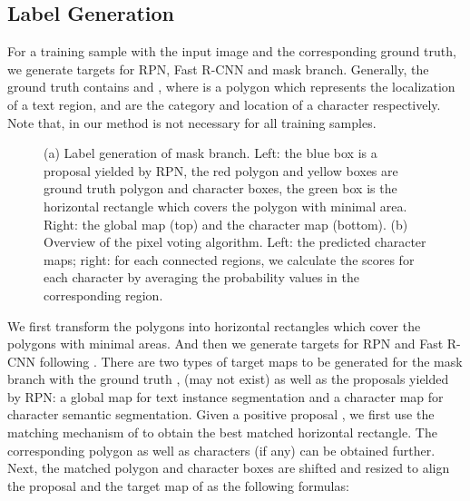 \documentclass[runningheads]{llncs}
\begin{document}
\subsection{Label Generation}
For a training sample with the input image  and the corresponding ground truth,  we generate targets for RPN, Fast R-CNN and mask branch. Generally, the ground truth contains  and , where  is a polygon which represents the localization of a text region,  and  are the category and location of a character respectively. Note that, in our method  is not necessary for all training samples. 



\begin{figure}[!b]
\begin{center}
\captionsetup[subfigure]{justification=centering}
    \centering
{}
\end{center}
 \caption{(a) Label generation of mask branch. Left: the blue box is a proposal yielded by RPN, the red polygon and yellow boxes are ground truth polygon and character boxes, the green box is the horizontal rectangle which covers the polygon with minimal area. Right: the global map (top) and the character map (bottom). (b) Overview of the pixel voting algorithm. Left: the predicted character maps; right: for each connected regions, we calculate the scores for each character by averaging the probability values in the corresponding region.}
\label{fig:denser-box}
\end{figure}

We first transform the polygons into horizontal rectangles which cover the polygons with minimal areas. And then we generate targets for RPN and Fast R-CNN following \cite{fastrcnn,ren2015faster,lin2017feature}. There are two types of target maps to be generated for the mask branch with the ground truth ,  (may not exist) as well as the proposals yielded by RPN: a global map for text instance segmentation and a character map for character semantic segmentation. 
Given a positive  proposal , we first use the matching mechanism of \cite{fastrcnn,ren2015faster,lin2017feature} to obtain the best matched horizontal rectangle. The corresponding polygon as well as characters (if any) can be obtained further. Next, the matched polygon and character boxes are shifted and resized to align the proposal and the target map of  as  the following formulas:
\end{document}
